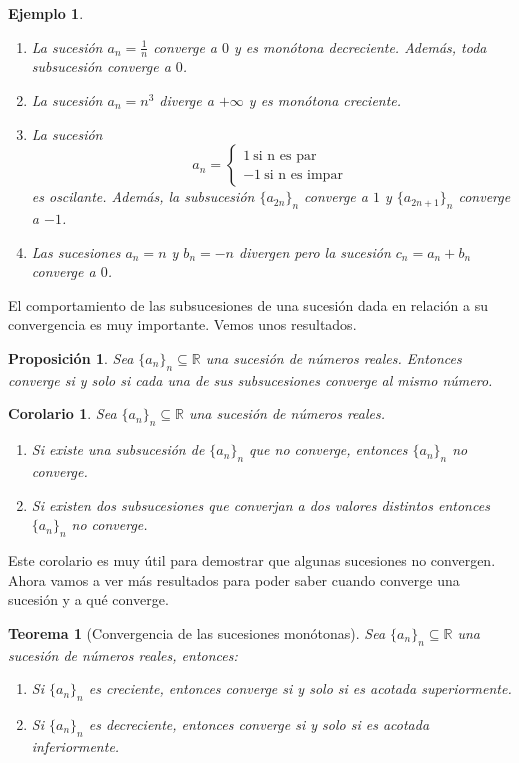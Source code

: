 \documentclass{article}
\newtheorem{theorem}{Teorema}
\newtheorem{prop}{Proposición}
\newtheorem{cor}{Corolario}
\newtheorem{ejem}{Ejemplo}
\newcommand{\reales}{\mathbb{R}}
\newcommand{\sucesion}[1]{\{ #1 _n \}_n}
\newcommand{\sucreal}[1]{\{ #1 _n \}_n \subseteq \reales}
\begin{document}
\begin{ejem}
\begin{enumerate}
\item
La sucesión $a_n = \frac{1}{n}$ converge a $0$ y es monótona decreciente. Además, toda subsucesión converge a $0$.
\item
La sucesión $a_n = n^3$ diverge a $+\infty$ y es monótona creciente.
\item
La sucesión 
\begin{equation}
a_n = \left\lbrace
\begin{array}{l}
1\ \text{si n es par}\\ 
-1\ \text{si n es impar}\
\end{array}
\right.
\end{equation}
es oscilante. Además, la subsucesión $\{a_{2n} \}_n$ converge a $1$ y $\{a_{2n+1} \}_n$ converge a $-1$.
\item
Las sucesiones $a_n = n$ y $b_n = -n$ divergen pero la sucesión $c_n = a_n + b_n$ converge a $0$.
\end{enumerate}
\end{ejem}

El comportamiento de las subsucesiones de una sucesión dada en relación a su convergencia es muy importante. Vemos unos resultados.

\begin{prop}
	Sea $\sucreal{a}$ una sucesión de números reales. Entonces converge si y solo si cada una de sus subsucesiones converge al mismo número.
\end{prop}

\begin{cor}
	Sea $\sucreal{a}$ una sucesión de números reales.
	\begin{enumerate}
		\item
		Si existe una subsucesión de $\sucesion{a}$ que no converge, entonces $\sucesion{a}$ no converge.
		\item
		Si existen dos subsucesiones que converjan a dos valores distintos entonces $\sucesion{a}$ no converge.
	\end{enumerate}
\end{cor}

Este corolario es muy útil para demostrar que algunas sucesiones no convergen. Ahora vamos a ver más resultados para poder saber cuando converge una sucesión y a qué converge.

\begin{theorem}[Convergencia de las sucesiones monótonas]
Sea $\sucreal{a}$ una sucesión de números reales, entonces:
\begin{enumerate}
\item
Si $\sucesion{a}$ es creciente, entonces converge si y solo si es acotada superiormente.
\item
Si $\{ a_n\}_n$ es decreciente, entonces converge si y solo si es acotada inferiormente. 
\end{enumerate}
\end{theorem}
\end{document}
